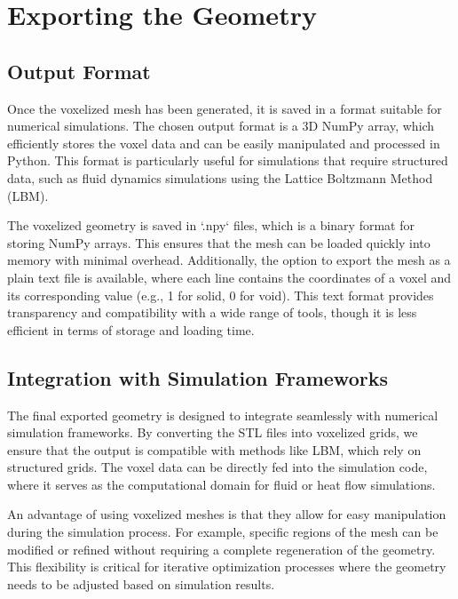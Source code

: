 \section{Exporting the Geometry}

\subsection{Output Format}

Once the voxelized mesh has been generated, it is saved in a format suitable for numerical simulations. The chosen output format is a 3D NumPy array, which efficiently stores the voxel data and can be easily manipulated and processed in Python. This format is particularly useful for simulations that require structured data, such as fluid dynamics simulations using the Lattice Boltzmann Method (LBM).

The voxelized geometry is saved in `.npy` files, which is a binary format for storing NumPy arrays. This ensures that the mesh can be loaded quickly into memory with minimal overhead. Additionally, the option to export the mesh as a plain text file is available, where each line contains the coordinates of a voxel and its corresponding value (e.g., 1 for solid, 0 for void). This text format provides transparency and compatibility with a wide range of tools, though it is less efficient in terms of storage and loading time.


\subsection{Integration with Simulation Frameworks}

The final exported geometry is designed to integrate seamlessly with numerical simulation frameworks. By converting the STL files into voxelized grids, we ensure that the output is compatible with methods like LBM, which rely on structured grids. The voxel data can be directly fed into the simulation code, where it serves as the computational domain for fluid or heat flow simulations.

An advantage of using voxelized meshes is that they allow for easy manipulation during the simulation process. For example, specific regions of the mesh can be modified or refined without requiring a complete regeneration of the geometry. This flexibility is critical for iterative optimization processes where the geometry needs to be adjusted based on simulation results.

